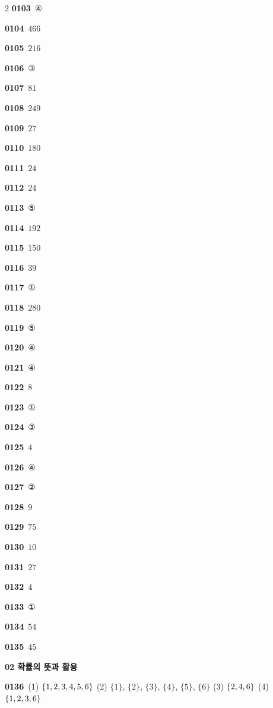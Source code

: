 \documentclass[10pt,a4paper]{article}
\begin{document}
\begin{multicols}{2}
\noindent\textbf{0103}\ ④\par
\noindent\textbf{0104}\ $466$\par
\noindent\textbf{0105}\ $216$\par
\noindent\textbf{0106}\ ③\par
\noindent\textbf{0107}\ $81$\par
\noindent\textbf{0108}\ $249$\par
\noindent\textbf{0109}\ $27$\par
\noindent\textbf{0110}\ $180$\par
\noindent\textbf{0111}\ $24$\par
\noindent\textbf{0112}\ $24$\par
\noindent\textbf{0113}\ ⑤\par
\noindent\textbf{0114}\ $192$\par
\noindent\textbf{0115}\ $150$\par
\noindent\textbf{0116}\ $39$\par
\noindent\textbf{0117}\ ①\par
\noindent\textbf{0118}\ $280$\par
\noindent\textbf{0119}\ ⑤\par
\noindent\textbf{0120}\ ④\par
\noindent\textbf{0121}\ ④\par
\noindent\textbf{0122}\ $8$\par
\noindent\textbf{0123}\ ①\par
\noindent\textbf{0124}\ ③\par
\noindent\textbf{0125}\ $4$\par
\noindent\textbf{0126}\ ④\par
\noindent\textbf{0127}\ ②\par
\noindent\textbf{0128}\ $9$\par
\noindent\textbf{0129}\ $75$\par
\noindent\textbf{0130}\ $10$\par
\noindent\textbf{0131}\ $27$\par
\noindent\textbf{0132}\ $4$\par
\noindent\textbf{0133}\ ①\par
\noindent\textbf{0134}\ $54$\par
\noindent\textbf{0135}\ $45$\par
\noindent\textbf{02 확률의 뜻과 활용}\par\smallskip
\noindent\textbf{0136}\ (1) $\{1{,}\mkern3mu\mathopen{}2{,}\mkern3mu\mathopen{}3{,}\mkern3mu\mathopen{}4{,}\mkern3mu\mathopen{}5{,}\mkern3mu\mathopen{}6\}$ (2) $\{1\}$, $\{2\}$, $\{3\}$, $\{4\}$, $\{5\}$, $\{6\}$ (3) $\{2{,}\mkern3mu\mathopen{}4{,}\mkern3mu\mathopen{}6\}$ (4) $\{1{,}\mkern3mu\mathopen{}2{,}\mkern3mu\mathopen{}3{,}\mkern3mu\mathopen{}6\}$\par

\end{multicols}
\end{document}
